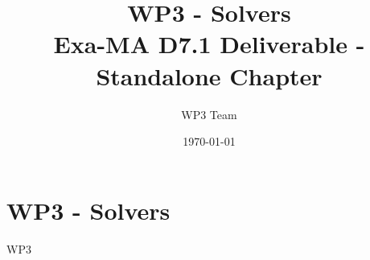 \documentclass[11pt]{report}
\begin{document}
\title{WP3 - Solvers\\
\large Exa-MA D7.1 Deliverable - Standalone Chapter}
\author{WP3 Team}
\date{\today}
\maketitle

\tableofcontents
\clearpage

\chapter{WP3 - Solvers}
\label{chap:wp3}

{WP3}

\clearpage


\end{document}
